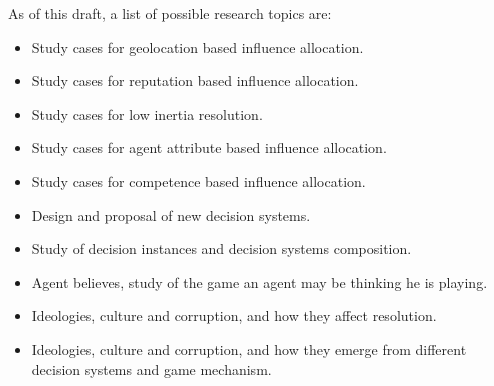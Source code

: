 As of this draft, a list of possible research topics are:

\begin{itemize}
  \item Study cases for geolocation based influence allocation.
  \item Study cases for reputation based influence allocation.
  \item Study cases for low inertia resolution.
  \item Study cases for agent attribute based influence allocation.
  \item Study cases for competence based influence allocation.
  \item Design and proposal of new decision systems.
  \item Study of decision instances and decision systems composition.
  \item Agent believes, study of the game an agent may be thinking he is playing.
  \item Ideologies, culture and corruption, and how they affect resolution.
  \item Ideologies, culture and corruption, and how they emerge from different decision systems and game mechanism.
\end{itemize}